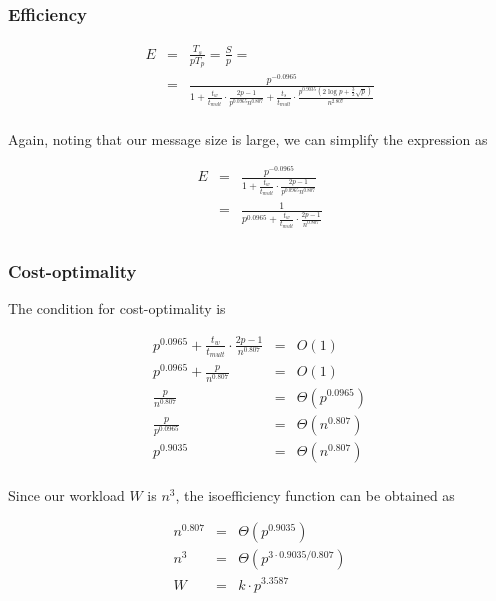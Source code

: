\documentclass{article}
\begin{document}
\subsubsection{Efficiency}

\begin{eqnarray*}
E &=& \frac{T_s}{pT_p} = \frac{S}{ p} = \\
&=& \frac{ p^{-0.0965} }{  1 + \frac{t_w}{t_{mult}} \cdot \frac{ 2p-1}{p^{0.0965}  n^{0.807}} + \frac{t_s}{t_{mult}} \cdot \frac{ p^{0.9035} \left(2 \log{p} + \frac{3}{2}\sqrt{p}\right) }{ n^{2.807} }  } \\
\end{eqnarray*}

Again, noting that our message size is large, we can simplify the expression as

\begin{eqnarray*}
E &=& \frac{ p^{-0.0965} }{  1 + \frac{t_w}{t_{mult}} \cdot \frac{ 2p-1}{p^{0.0965}  n^{0.807}}   } \\
&=& \frac{ 1 }{  p^{0.0965} + \frac{t_w}{t_{mult}} \cdot \frac{ 2p-1}{ n^{0.807}}   } \\
\end{eqnarray*}

\subsubsection{Cost-optimality}

The condition for cost-optimality is

\begin{eqnarray*}
  p^{0.0965} + \frac{t_w}{t_{mult}} \cdot \frac{ 2p-1}{ n^{0.807}}    &=& O(1) \\
  p^{0.0965} + \frac{ p}{ n^{0.807}}    &=& O(1) \\
  \frac{ p}{ n^{0.807}}    &=& \Theta(p^{0.0965}) \\
  \frac{ p}{ p^{0.0965}}    &=& \Theta(n^{0.807}) \\
  p^{0.9035}    &=& \Theta(n^{0.807}) \\
\end{eqnarray*}

Since our workload $W$ is $n^3$, the isoefficiency function can be obtained as

\begin{eqnarray*}
n^{0.807} &=& \Theta (p^{0.9035}) \\
n^3 &=& \Theta (p^{3 \cdot 0.9035 /  0.807}) \\
W &=& k \cdot p^{3.3587} \\
\end{eqnarray*}
\end{document}
